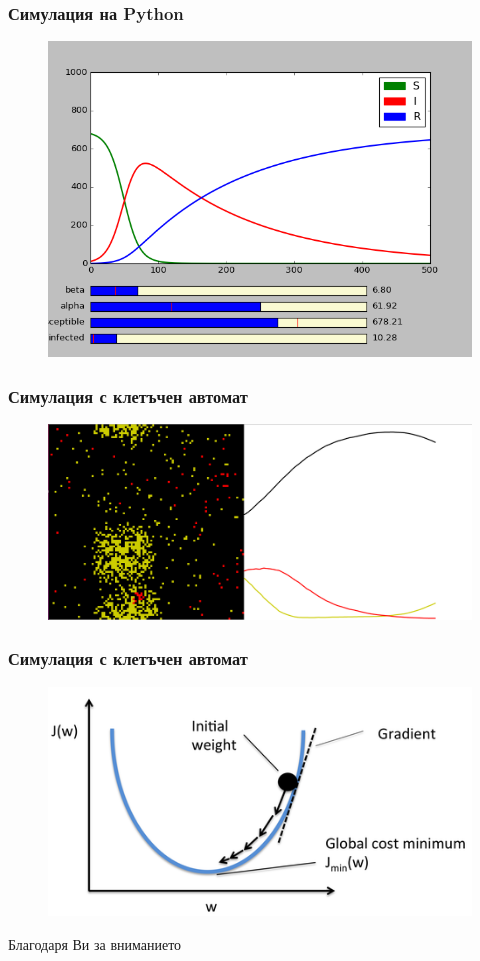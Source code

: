 \documentclass[14pt]{beamer}
\begin{document}
\begin{frame}
\frametitle{Симулация на Python}
    \begin{figure}[H]
      \center
      \includegraphics[width=0.8\linewidth]{python}
    \end{figure}
\end{frame}

\begin{frame}
\frametitle{Симулация с клетъчен автомат}
\begin{figure}[H]
  \center
  \includegraphics[width=0.8\linewidth]{automat}
\end{figure}
\end{frame}

\begin{frame}
\frametitle{Симулация с клетъчен автомат}
\begin{figure}[H]
  \center
  \includegraphics[width=0.8\linewidth]{gradient}
\end{figure}
\end{frame}



\begin{frame}
\begin{center}
Благодаря Ви за вниманието
\end{center}
\end{frame}
\end{document}
